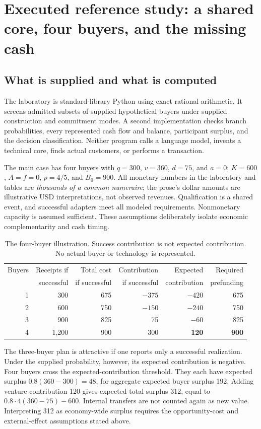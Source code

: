 \documentclass[11pt,letterpaper]{article}
\theoremstyle{remark}\newtheorem{remark}{Remark}[section]
\begin{document}
\section{Executed reference study: a shared core, four buyers, and the missing cash}
\label{sec:study}
\subsection{What is supplied and what is computed}
The laboratory is standard-library Python using exact rational arithmetic. It screens admitted subsets of supplied hypothetical buyers under supplied construction and commitment modes. A second implementation checks branch probabilities, every represented cash flow and balance, participant surplus, and the decision classification. Neither program calls a language model, invents a technical core, finds actual customers, or performs a transaction.

The main case has four buyers with $q=300$, $v=360$, $d=75$, and $a=0$; $K=600$, $A=f=0$, $p=4/5$, and $B_0=900$. All monetary numbers in the laboratory and tables are \emph{thousands of a common numeraire}; the prose's dollar amounts are illustrative USD interpretations, not observed revenues. Qualification is a shared event, and successful adapters meet all modeled requirements. Nonmonetary capacity is assumed sufficient. These assumptions deliberately isolate economic complementarity and cash timing.

\begin{table}[htbp]\centering\small
\caption{The four-buyer illustration. Success contribution is not expected contribution. No actual buyer or technology is represented.}\label{tab:coalitions}
\begin{tabular}{@{}rrrrrr@{}}\toprule
Buyers & Receipts if & Total cost & Contribution & Expected & Required\\
 & successful & if successful & if successful & contribution & prefunding\\\midrule
1 & 300 & 675 & $-375$ & $-420$ & 675\\
2 & 600 & 750 & $-150$ & $-240$ & 750\\
3 & 900 & 825 & 75 & $-60$ & 825\\
4 & 1,200 & 900 & 300 & \textbf{120} & \textbf{900}\\\bottomrule
\end{tabular}
\end{table}

The three-buyer plan is attractive if one reports only a successful realization. Under the supplied probability, however, its expected contribution is negative. Four buyers cross the expected-contribution threshold. They each have expected surplus $0.8(360-300)=48$, for aggregate expected buyer surplus 192. Adding venture contribution 120 gives expected total surplus 312, equal to $0.8\cdot4(360-75)-600$. Internal transfers are not counted again as new value. Interpreting 312 as economy-wide surplus requires the opportunity-cost and external-effect assumptions stated above.
\end{document}
